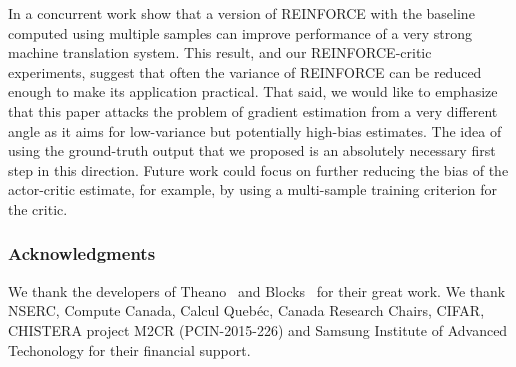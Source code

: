 \documentclass{article} %
\begin{document}
In a concurrent work \citet{wu2016google} show that a version of REINFORCE with
the baseline computed using multiple samples can improve performance of a very
strong machine translation system. This result, and our REINFORCE-critic
experiments, suggest that often the variance of REINFORCE can be reduced
enough to make its application practical. That said, we would like to emphasize
that this paper attacks the problem of gradient estimation from a very
different angle as it aims for low-variance but potentially high-bias
estimates. The idea of using the ground-truth output that we proposed is an
absolutely necessary first step in this direction. Future work could focus on
further reducing the bias of the actor-critic estimate, for example, by using a
multi-sample training criterion for the critic.



\subsubsection*{Acknowledgments}
We thank the developers of Theano~\citep{team2016theano} and Blocks~\citep{blocksfuel} for
their great work. We thank NSERC, Compute Canada, Calcul Queb\'ec, Canada Research
Chairs, CIFAR, CHISTERA project M2CR (PCIN-2015-226) and Samsung Institute of Advanced Techonology for their financial support.





\newpage
\appendix

\end{document}
